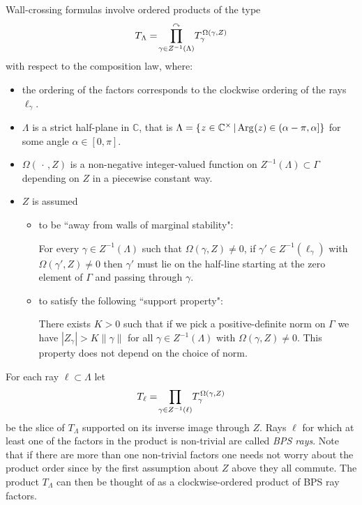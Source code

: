 \documentclass[11pt]{amsart}
\theoremstyle{remark}
\theoremstyle{remark}
\theoremstyle{definition}
\theoremstyle{definition}
\theoremstyle{definition}
\newcommand{\0}{{\scriptstyle 0'}} %
\newcommand{\1}{{\scriptstyle 1'}}
\newcommand{\pt}{\hspace{1pt}} %
\newcommand{\hp}{\hspace{0.5pt}} %
\begin{document}
Wall-crossing formulas involve ordered products of the type
\begin{equation}
T_{\hp \Lambda} = \! \prod^{\curvearrowright}_{\gamma \in Z^{-1}(\Lambda)} \! T_{\gamma}^{\pt \Omega(\gamma,Z)}
\end{equation}
with respect to the composition law, where:
\begin{itemize}[leftmargin=\leftmargin-14pt]
\setlength{\itemsep}{2pt}

\item the ordering of the factors corresponds to the clockwise ordering of the rays $\ell_{\gamma}$. 

\item $\Lambda$ is a strict half-plane in $\mathbb{C}$, that is $\Lambda  = \{ \hp z \in \mathbb{C}^{\times} \, | \, \text{Arg}\hp (z) \in (\alpha - \pi,\alpha] \}$ for some angle $\alpha \in [0,\pi]$. 

\item $\Omega(\,\cdot\,,Z)$ is a non-negative integer-valued function on $Z^{-1}(\Lambda) \subset \Gamma$ depending on $Z$ in a piecewise constant way.

\item $Z$ is assumed 
\begin{itemize}
\setlength{\itemsep}{2pt}
\item to be ``away from walls of marginal stability": \smallskip

For every $\gamma \in Z^{-1}(\Lambda)$ such that $\Omega(\gamma,Z) \neq 0$, if $\gamma' \in Z^{-1}(\ell_{\gamma})$ with $\Omega(\gamma',Z) \neq 0$ then $\gamma'$ must lie on the half-line  starting at the zero element of $\Gamma$ and passing through $\gamma$. 

\item to satisfy the following ``support property": \smallskip

There exists $K>0$ such that if we pick a positive-definite norm on $\Gamma$ we have $|Z_{\gamma}| > K \|\gamma\|$ for all $\gamma \in Z^{-1}(\Lambda)$ with $\Omega(\gamma,Z) \neq 0$. This property does not depend on the choice of norm. 
\end{itemize}
\end{itemize}

\noindent For each ray $\ell \subset \Lambda$ let
\begin{equation}
T_{\hp \ell} = \! \prod_{\gamma \in Z^{-1}(\ell) } \! T_{\gamma}^{\pt \Omega(\gamma,Z)} 
\end{equation}
be the slice of $T_{\Lambda}$ supported on its inverse image through $Z$. Rays $\ell$ for which at least one of the factors in the product is non-trivial are called \textit{BPS rays}. Note that if there are more than one non-trivial factors one needs not worry about the product order since by the first assumption about $Z$ above they all commute. The product $T_{\Lambda}$ can then be thought of as a clockwise-ordered product of BPS ray factors. 
\end{document}
